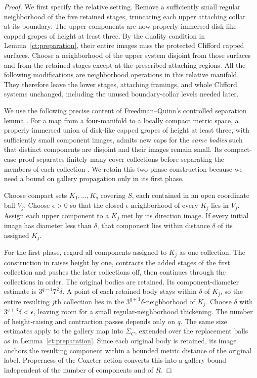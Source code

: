 \documentclass[11pt]{article}
\theoremstyle{definition}
\theoremstyle{remark}
\begin{document}
\begin{proof}
We first specify the relative setting. Remove a sufficiently small
regular neighborhood of the five retained stages, truncating each upper
attaching collar at its boundary. The upper components are now properly
immersed disk-like capped gropes of height at least three. By the duality
condition in Lemma~\ref{ct:preparation}, their entire images miss the
protected Clifford capped surfaces. Choose a neighborhood of the upper
system disjoint from those surfaces and from the retained stages except
at the prescribed attaching regions. All the following modifications
are neighborhood operations in this relative manifold. They therefore
leave the lower stages, attaching framings, and whole Clifford systems
unchanged, including the unused boundary-collar levels needed later.

We use the following precise content of Freedman--Quinn's controlled
separation lemma \cite[Lemma~2.10.1]{FQ}. For a map from a four-manifold
to a locally compact metric space, a properly immersed union of
disk-like capped gropes of height at least three, with sufficiently
small component images, admits new caps for the \emph{same bodies}
such that distinct components are disjoint and their images remain
small. Its compact-case proof separates finitely many cover collections
before separating the members of each collection
\cite[Section~2.10.2]{FQ}. We retain this two-phase construction because
we need a bound on gallery propagation only in its first phase.

Choose compact sets $K_1,\ldots,K_q$ covering $S$, each contained in an
open coordinate ball $V_j$. Choose $\epsilon>0$ so that the closed
$\epsilon$-neighborhood of every $K_j$ lies in $V_j$. Assign each upper
component to a $K_j$ met by its direction image. If every initial image
has diameter less than $\delta$, that component lies within distance
$\delta$ of its assigned $K_j$.

For the first phase, regard all components assigned to $K_j$ as one
collection. The construction in \cite[Section~2.10.2]{FQ} raises height
by one, contracts the added stages of the first collection and pushes
the later collections off, then continues through the collections in
order. The original bodies are retained. Its component-diameter estimate is
$3^{q-1}7^2\delta$. A point of each retained body stays within
$\delta$ of $K_j$, so the entire resulting $j$th collection lies in
the $3^{q+3}\delta$-neighborhood of $K_j$. Choose $\delta$ with
$3^{q+3}\delta<\epsilon$, leaving room for a small regular-neighborhood
thickening. The number of height-raising and contraction passes depends
only on $q$. The same size estimates apply to the gallery map into
$\Sigma_C$, extended over the replacement balls as in
Lemma~\ref{ct:preparation}. Since each original body is retained, its
image anchors the resulting component within a bounded metric distance
of the original label. Properness of the Coxeter action converts this
into a gallery bound independent of the number of components and of $R$.


\end{proof}
\end{document}
